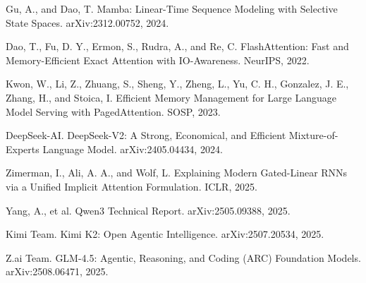 \documentclass[12pt,a4paper]{article}
\begin{document}
\begin{enumerate}[label={[\arabic*]}, resume]
    \item Gu, A., and Dao, T. Mamba: Linear-Time Sequence Modeling with Selective State Spaces. arXiv:2312.00752, 2024.

    \item Dao, T., Fu, D. Y., Ermon, S., Rudra, A., and Re, C. FlashAttention: Fast and Memory-Efficient Exact Attention with IO-Awareness. NeurIPS, 2022.

    \item Kwon, W., Li, Z., Zhuang, S., Sheng, Y., Zheng, L., Yu, C. H., Gonzalez, J. E., Zhang, H., and Stoica, I. Efficient Memory Management for Large Language Model Serving with PagedAttention. SOSP, 2023.

    \item DeepSeek-AI. DeepSeek-V2: A Strong, Economical, and Efficient Mixture-of-Experts Language Model. arXiv:2405.04434, 2024.

    \item Zimerman, I., Ali, A. A., and Wolf, L. Explaining Modern Gated-Linear RNNs via a Unified Implicit Attention Formulation. ICLR, 2025.

    \item Yang, A., et al. Qwen3 Technical Report. arXiv:2505.09388, 2025.

    \item Kimi Team. Kimi K2: Open Agentic Intelligence. arXiv:2507.20534, 2025.

    \item Z.ai Team. GLM-4.5: Agentic, Reasoning, and Coding (ARC) Foundation Models. arXiv:2508.06471, 2025.
\end{enumerate}
\end{document}
